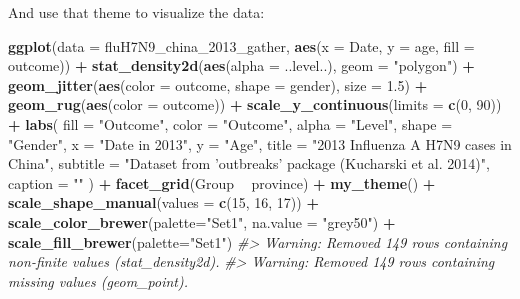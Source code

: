 \documentclass[]{book}
\newenvironment{Shaded}{\begin{snugshade}}{\end{snugshade}}
\newcommand{\CommentTok}[1]{\textcolor[rgb]{0.56,0.35,0.01}{\textit{#1}}}
\newcommand{\DataTypeTok}[1]{\textcolor[rgb]{0.13,0.29,0.53}{#1}}
\newcommand{\DecValTok}[1]{\textcolor[rgb]{0.00,0.00,0.81}{#1}}
\newcommand{\FloatTok}[1]{\textcolor[rgb]{0.00,0.00,0.81}{#1}}
\newcommand{\KeywordTok}[1]{\textcolor[rgb]{0.13,0.29,0.53}{\textbf{#1}}}
\newcommand{\NormalTok}[1]{#1}
\newcommand{\OperatorTok}[1]{\textcolor[rgb]{0.81,0.36,0.00}{\textbf{#1}}}
\newcommand{\StringTok}[1]{\textcolor[rgb]{0.31,0.60,0.02}{#1}}
\begin{document}
And use that theme to visualize the data:

\begin{Shaded}
\begin{Highlighting}[]
\KeywordTok{ggplot}\NormalTok{(}\DataTypeTok{data =}\NormalTok{ fluH7N9_china_}\DecValTok{2013}\NormalTok{_gather, }\KeywordTok{aes}\NormalTok{(}\DataTypeTok{x =}\NormalTok{ Date, }\DataTypeTok{y =}\NormalTok{ age, }\DataTypeTok{fill =}\NormalTok{ outcome)) }\OperatorTok{+}
\StringTok{  }\KeywordTok{stat_density2d}\NormalTok{(}\KeywordTok{aes}\NormalTok{(}\DataTypeTok{alpha =}\NormalTok{ ..level..), }\DataTypeTok{geom =} \StringTok{"polygon"}\NormalTok{) }\OperatorTok{+}
\StringTok{  }\KeywordTok{geom_jitter}\NormalTok{(}\KeywordTok{aes}\NormalTok{(}\DataTypeTok{color =}\NormalTok{ outcome, }\DataTypeTok{shape =}\NormalTok{ gender), }\DataTypeTok{size =} \FloatTok{1.5}\NormalTok{) }\OperatorTok{+}
\StringTok{  }\KeywordTok{geom_rug}\NormalTok{(}\KeywordTok{aes}\NormalTok{(}\DataTypeTok{color =}\NormalTok{ outcome)) }\OperatorTok{+}
\StringTok{  }\KeywordTok{scale_y_continuous}\NormalTok{(}\DataTypeTok{limits =} \KeywordTok{c}\NormalTok{(}\DecValTok{0}\NormalTok{, }\DecValTok{90}\NormalTok{)) }\OperatorTok{+}
\StringTok{  }\KeywordTok{labs}\NormalTok{(}
    \DataTypeTok{fill =} \StringTok{"Outcome"}\NormalTok{,}
    \DataTypeTok{color =} \StringTok{"Outcome"}\NormalTok{,}
    \DataTypeTok{alpha =} \StringTok{"Level"}\NormalTok{,}
    \DataTypeTok{shape =} \StringTok{"Gender"}\NormalTok{,}
    \DataTypeTok{x =} \StringTok{"Date in 2013"}\NormalTok{,}
    \DataTypeTok{y =} \StringTok{"Age"}\NormalTok{,}
    \DataTypeTok{title =} \StringTok{"2013 Influenza A H7N9 cases in China"}\NormalTok{,}
    \DataTypeTok{subtitle =} \StringTok{"Dataset from 'outbreaks' package (Kucharski et al. 2014)"}\NormalTok{,}
    \DataTypeTok{caption =} \StringTok{""}
\NormalTok{  ) }\OperatorTok{+}
\StringTok{  }\KeywordTok{facet_grid}\NormalTok{(Group }\OperatorTok{~}\StringTok{ }\NormalTok{province) }\OperatorTok{+}
\StringTok{  }\KeywordTok{my_theme}\NormalTok{() }\OperatorTok{+}
\StringTok{  }\KeywordTok{scale_shape_manual}\NormalTok{(}\DataTypeTok{values =} \KeywordTok{c}\NormalTok{(}\DecValTok{15}\NormalTok{, }\DecValTok{16}\NormalTok{, }\DecValTok{17}\NormalTok{)) }\OperatorTok{+}
\StringTok{  }\KeywordTok{scale_color_brewer}\NormalTok{(}\DataTypeTok{palette=}\StringTok{"Set1"}\NormalTok{, }\DataTypeTok{na.value =} \StringTok{"grey50"}\NormalTok{) }\OperatorTok{+}
\StringTok{  }\KeywordTok{scale_fill_brewer}\NormalTok{(}\DataTypeTok{palette=}\StringTok{"Set1"}\NormalTok{)}
\CommentTok{#> Warning: Removed 149 rows containing non-finite values (stat_density2d).}
\CommentTok{#> Warning: Removed 149 rows containing missing values (geom_point).}
\end{Highlighting}
\end{Shaded}
\end{document}
